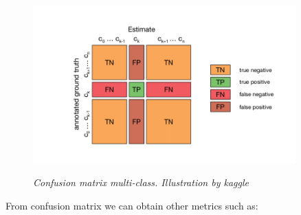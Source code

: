 \begin{figure}[H]
  \begin{adjustbox}{trim={0pt 0.5cm 0pt 1cm}, clip}
    \centering
    \includegraphics[width=0.9\textwidth]{imatges/validation-strategy/confusion-matrix.png}
  \end{adjustbox}
  \caption[Confusion matrix multi-class]{\textit{Confusion matrix multi-class. Illustration by kaggle}}
  {\label{fig:confusion-matrix}}
\end{figure}

From confusion matrix we can obtain other metrics such as:

